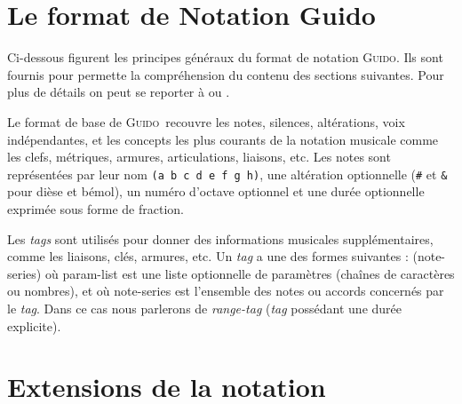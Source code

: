 \documentclass{article}
\newenvironment{gmncode}	{\vspace{-2mm}\small\verbatim}{\endverbatim\vspace{-2mm}}
\newcommand{\guido}			{\textsc{Guido}}
\newcommand{\code}[1]		{{\small \texttt{#1}}}
\begin{document}
\section{Le format de Notation Guido}\label{sec:format_notation}

Ci-dessous figurent les principes généraux du format de notation \guido . Ils sont fournis pour permette la compréhension du contenu des sections suivantes. Pour plus de détails on peut se reporter à \cite{Dau:09a} ou \cite{guido}.

Le format de base de \guido\ recouvre les notes, silences, altérations, voix indépendantes, et les concepts les plus courants de la notation musicale comme les clefs, métriques, armures, articulations, liaisons, etc.
Les notes sont représentées par leur nom \code{(a b c d e f g h)}, une altération optionnelle (\code{\#} et \code{\&} pour dièse et bémol), un numéro d'octave optionnel et une durée optionnelle exprimée sous forme de fraction.



Les \emph{tags} sont utilisés pour donner des informations musicales supplémentaires, comme les liaisons, clés, armures, etc. Un \emph{tag} a une des formes suivantes : 
\begin{gmncode}
    (note-series)
\end{gmncode}
où param-list est une liste optionnelle de paramètres (chaînes de caractères ou nombres), et où note-series est l'ensemble des notes ou accords concernés par le \emph{tag}. Dans ce cas nous parlerons de \emph{range-tag} (\emph{tag} possédant une durée explicite).


\section{Extensions de la notation}\label{sec:extension}
\end{document}
